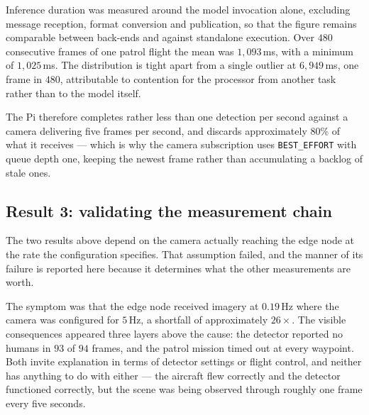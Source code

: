 Inference duration was measured around the model invocation alone, excluding
message reception, format conversion and publication, so that the figure
remains comparable between back-ends and against standalone execution. Over
\(480\) consecutive frames of one patrol flight the mean was
\(1{,}093\)\,ms, with a minimum of \(1{,}025\)\,ms. The distribution is tight
apart from a single outlier at \(6{,}949\)\,ms, one frame in \(480\),
attributable to contention for the processor from another task rather than to
the model itself.

The Pi therefore completes rather less than one detection per second against a
camera delivering five frames per second, and discards approximately \(80\%\)
of what it receives --- which is why the camera subscription uses
\texttt{BEST\_EFFORT} with queue depth one, keeping the newest frame rather
than accumulating a backlog of stale ones.

\subsection{Result 3: validating the measurement chain}
\label{sec:test-chain}

The two results above depend on the camera actually reaching the edge node
at the rate the configuration specifies. That assumption failed, and the
manner of its failure is reported here because it determines what the other
measurements are worth.

The symptom was that the edge node received imagery at \(0.19\)\,Hz where
the camera was configured for \(5\)\,Hz, a shortfall of approximately
\(26\times\). The visible consequences appeared three layers above the
cause: the detector reported no humans in \(93\) of \(94\) frames, and the
patrol mission timed out at every waypoint. Both invite explanation in terms
of detector settings or flight control, and neither has anything to do with
either --- the aircraft flew correctly and the detector functioned
correctly, but the scene was being observed through roughly one frame every
five seconds.

